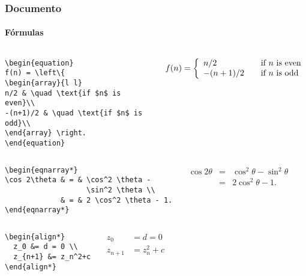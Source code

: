 \begin{frame}[fragile]
\frametitle{Documento}
\framesubtitle{Fórmulas}
  \scriptsize
  \begin{columns}[c]
  \begin{verbatim}
\begin{equation}
f(n) = \left\{ 
\begin{array}{l l}
n/2 & \quad \text{if $n$ is even}\\
-(n+1)/2 & \quad \text{if $n$ is odd}\\
\end{array} \right.
\end{equation}
  \end{verbatim}
  \begin{fmpage}{\textwidth}
\begin{equation}
f(n) = \left\{ 
\begin{array}{l l}
n/2 & \quad \text{if $n$ is even}\\
-(n+1)/2 & \quad \text{if $n$ is odd}\\
\end{array} \right.
\end{equation}
  \end{fmpage}
  \end{columns}

  \vspace{-0.3cm}
  \begin{columns}[c]
  \begin{verbatim}
\begin{eqnarray*}
\cos 2\theta & = & \cos^2 \theta - 
                   \sin^2 \theta \\
             & = & 2 \cos^2 \theta - 1.
\end{eqnarray*}
  \end{verbatim}
  \begin{fmpage}{\textwidth}
\begin{eqnarray*}
\cos 2\theta & = & \cos^2 \theta - 
                   \sin^2 \theta \\
             & = & 2 \cos^2 \theta - 1.
\end{eqnarray*}
  \end{fmpage}
  \end{columns}

 \vspace{-0.3cm}
  \begin{columns}[c]
  \begin{verbatim}
\begin{align*}
  z_0 &= d = 0 \\
  z_{n+1} &= z_n^2+c
\end{align*}
  \end{verbatim}
  \begin{fmpage}{\textwidth}
\begin{align*}
  z_0 &= d = 0 \\
  z_{n+1} &= z_n^2+c
\end{align*}
  \end{fmpage}
  \end{columns}
\end{frame}


